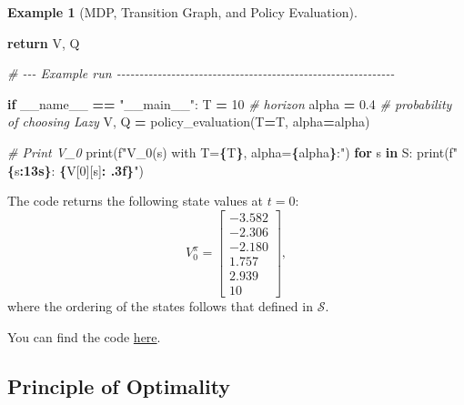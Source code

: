\documentclass[
]{book}
\newenvironment{Shaded}{\begin{snugshade}}{\end{snugshade}}
\newcommand{\BuiltInTok}[1]{#1}
\newcommand{\CommentTok}[1]{\textcolor[rgb]{0.56,0.35,0.01}{\textit{#1}}}
\newcommand{\ControlFlowTok}[1]{\textcolor[rgb]{0.13,0.29,0.53}{\textbf{#1}}}
\newcommand{\DecValTok}[1]{\textcolor[rgb]{0.00,0.00,0.81}{#1}}
\newcommand{\FloatTok}[1]{\textcolor[rgb]{0.00,0.00,0.81}{#1}}
\newcommand{\KeywordTok}[1]{\textcolor[rgb]{0.13,0.29,0.53}{\textbf{#1}}}
\newcommand{\NormalTok}[1]{#1}
\newcommand{\OperatorTok}[1]{\textcolor[rgb]{0.81,0.36,0.00}{\textbf{#1}}}
\newcommand{\SpecialCharTok}[1]{\textcolor[rgb]{0.81,0.36,0.00}{\textbf{#1}}}
\newcommand{\SpecialStringTok}[1]{\textcolor[rgb]{0.31,0.60,0.02}{#1}}
\newcommand{\StringTok}[1]{\textcolor[rgb]{0.31,0.60,0.02}{#1}}
\newcommand{\VariableTok}[1]{\textcolor[rgb]{0.00,0.00,0.00}{#1}}
\theoremstyle{definition}
\theoremstyle{definition}
\newtheorem{example}{Example}[chapter]
\theoremstyle{definition}
\theoremstyle{definition}
\theoremstyle{remark}
\begin{document}
\begin{example}[MDP, Transition Graph, and Policy Evaluation]
\begin{Shaded}
\begin{Highlighting}[]
    \ControlFlowTok{return}\NormalTok{ V, Q}

\CommentTok{\# {-}{-}{-} Example run {-}{-}{-}{-}{-}{-}{-}{-}{-}{-}{-}{-}{-}{-}{-}{-}{-}{-}{-}{-}{-}{-}{-}{-}{-}{-}{-}{-}{-}{-}{-}{-}{-}{-}{-}{-}{-}{-}{-}{-}{-}{-}{-}{-}{-}{-}{-}{-}{-}{-}{-}{-}{-}{-}{-}{-}{-}{-}{-}{-}{-}}

\ControlFlowTok{if} \VariableTok{\_\_name\_\_} \OperatorTok{==} \StringTok{"\_\_main\_\_"}\NormalTok{:}
\NormalTok{    T }\OperatorTok{=} \DecValTok{10}        \CommentTok{\# horizon}
\NormalTok{    alpha }\OperatorTok{=} \FloatTok{0.4}  \CommentTok{\# probability of choosing Lazy}
\NormalTok{    V, Q }\OperatorTok{=}\NormalTok{ policy\_evaluation(T}\OperatorTok{=}\NormalTok{T, alpha}\OperatorTok{=}\NormalTok{alpha)}

    \CommentTok{\# Print V\_0}
    \BuiltInTok{print}\NormalTok{(}\SpecialStringTok{f"V\_0(s) with T=}\SpecialCharTok{\{}\NormalTok{T}\SpecialCharTok{\}}\SpecialStringTok{, alpha=}\SpecialCharTok{\{}\NormalTok{alpha}\SpecialCharTok{\}}\SpecialStringTok{:"}\NormalTok{)}
    \ControlFlowTok{for}\NormalTok{ s }\KeywordTok{in}\NormalTok{ S:}
        \BuiltInTok{print}\NormalTok{(}\SpecialStringTok{f"  }\SpecialCharTok{\{}\NormalTok{s}\SpecialCharTok{:13s\}}\SpecialStringTok{: }\SpecialCharTok{\{}\NormalTok{V[}\DecValTok{0}\NormalTok{][s]}\SpecialCharTok{: .3f\}}\SpecialStringTok{"}\NormalTok{)}
\end{Highlighting}
\end{Shaded}

The code returns the following state values at \(t=0\):
\begin{equation}
V^{\pi}_0 = \begin{bmatrix}
-3.582 \\ -2.306 \\ -2.180 \\ 1.757 \\ 2.939 \\ 10
\end{bmatrix},
\label{eq:HangoverRandomValueFunction}
\end{equation}
where the ordering of the states follows that defined in \(\mathcal{S}\).

You can find the code \href{https://github.com/ComputationalRobotics/2025-ES-AM-158-LECTURE-CODE/blob/main/hangover_policy_evaluation.py}{here}.
\end{example}

\subsection{Principle of Optimality}\label{optimality}
\end{document}
